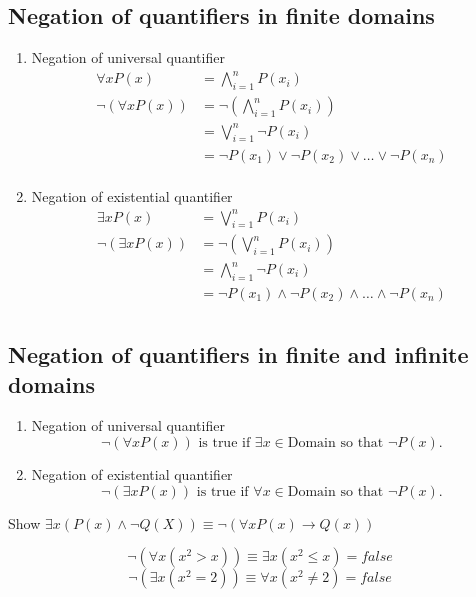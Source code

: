 \documentclass[a4paper, 12pt]{article}
\newenvironment{example}[1][Example]{\begin{trivlist}
\item[\hskip \labelsep {\bfseries #1}]}{\end{trivlist}}
\begin{document}
    \subsection*{Negation of quantifiers in finite domains}
    \begin{enumerate}
        \item Negation of universal quantifier
        \begin{align*}
            \forall x P(x) &= \bigwedge_{i = 1}^{n} P(x_i)\\
            \neg(\forall x P(x)) &= \neg(\bigwedge_{i = 1}^{n} P(x_i))\\
            &= \bigvee_{i = 1}^{n} \neg P(x_i)\\
            &= \neg P(x_1) \vee \neg P(x_2) \vee \dots \vee \neg P(x_n)\\
        \end{align*}
        \item Negation of existential quantifier
        \begin{align*}
            \exists x P(x) &= \bigvee_{i = 1}^{n} P(x_i)\\
            \neg(\exists x P(x)) &= \neg(\bigvee_{i = 1}^{n} P(x_i))\\
            &= \bigwedge_{i = 1}^{n} \neg P(x_i)\\
            &= \neg P(x_1) \wedge \neg P(x_2) \wedge \dots \wedge \neg P(x_n)\\
        \end{align*}
    \end{enumerate}
    \subsection*{Negation of quantifiers in finite and infinite domains}
    \begin{enumerate}
        \item Negation of universal quantifier
        \[\neg(\forall x P(x)) \text{ is true if }
        \exists x \in \text{Domain} \text{ so that } \neg P(x).\]
        \item Negation of existential quantifier
        \[\neg(\exists x P(x)) \text{ is true if }
        \forall x \in \text{Domain} \text{ so that } \neg P(x).\]
    \end{enumerate}
    \begin{example}
        Show $\exists x (P(x) \wedge \neg Q(X)) \equiv
        \neg(\forall x P(x) \rightarrow Q(x))$
    \end{example}
    \begin{example}
        \[\neg(\forall x (x^2 > x)) \equiv \exists x (x^2 \le x) = false\]
        \[\neg(\exists x (x^2 = 2)) \equiv \forall x (x^2 \ne 2) = false\]
    \end{example}
\end{document}
